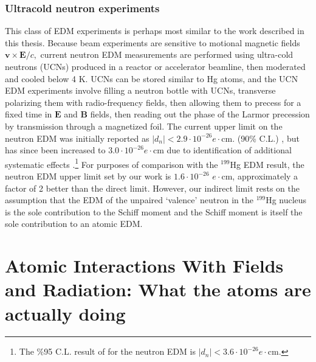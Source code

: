 \documentclass [10pt, twoside] {uwthesis}[2012/04/02]
\begin{document}
\subsection{Ultracold neutron experiments} %
This class of EDM experiments is perhaps most similar to the work described in this thesis. Because beam experiments are sensitive to motional magnetic fields $\mathbf{v} \times \mathbf{E}/c,$ current neutron EDM measurements are performed using ultra-cold neutrons (UCNs) produced in a reactor or accelerator beamline, then moderated and cooled below 4 K. UCNs can be stored similar to Hg atoms, and the UCN EDM experiments involve filling a neutron bottle with UCNs, transverse polarizing them with radio-frequency fields, then allowing them to precess for a fixed time in $\mathbf{E}$ and $\mathbf{B}$ fields, then reading out the phase of the Larmor precession by transmission through a magnetized foil. The current upper limit on the neutron EDM was initially reported as $|d_n| < 2.9 \cdot 10^{-26} e \cdot \text{cm}.$ (90\% C.L.) \cite{2006_ILL_nEDM}, but has since been increased to $3.0 \cdot 10^{-26} e \cdot \text{cm}$ due to identification of additional systematic effects \cite{2015_ILL_nEDM_gravity_correction}.\footnote{The \%95 C.L. result of \cite{2015_ILL_nEDM_gravity_correction} for the neutron EDM is $|d_n| < 3.6 \cdot 10^{-26} e \cdot \text{cm}.$} For purposes of comparison with the $^{199}$Hg EDM result, the neutron EDM upper limit set by our work is $1.6\cdot 10^{-26}$ $e\cdot\text{cm}$, approximately a factor of 2 better than the direct limit. However, our indirect limit rests on the assumption that the EDM of the unpaired `valence' neutron in the $^{199}$Hg nucleus is the sole contribution to the Schiff moment and the Schiff moment is itself the sole contribution to an atomic EDM.

\chapter{Atomic Interactions With Fields and Radiation: What the atoms are actually doing}
\end{document}
